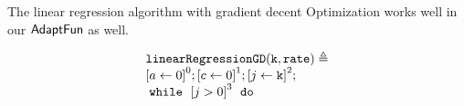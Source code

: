 %
\begin{example}
\label{ex:linearregression}
    The linear regression algorithm with gradient decent Optimization works well 
    in our $\textsf{AdaptFun}$ as well.
\begin{figure}
\centering
\begin{subfigure}{0.45\textwidth}
    \centering
    {\small
        \[
        \begin{array}{l}
            \kw{linearRegressionGD(k, rate)} \triangleq \\
                   \clabel{ a \leftarrow 0}^{0} ; 
                   \clabel{ c \leftarrow 0}^{1} ; 
                    \clabel{\assign{j}{\kw{k}} }^{2} ; \\
                    \ewhile ~ \clabel{j > 0}^{3} ~ \edo ~ \\

\end{array}\]}
\end{subfigure}
\end{figure}
\end{example}
